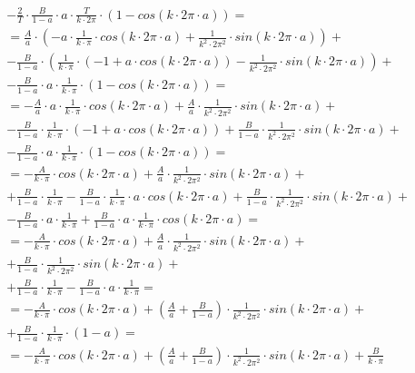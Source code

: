 \begin{task}
\begin{align*}
&- \frac{2}{T}\cdot \frac{B}{1-a}\cdot a \cdot \frac{T}{k \cdot 2\pi} \cdot \left(1 - cos\left(k \cdot 2\pi \cdot a\right) \right)=\\
&=\frac{A}{a}\cdot \left( - a\cdot \frac{1}{k \cdot \pi} \cdot cos\left( k \cdot 2\pi \cdot a\right) + \frac{1}{k^2 \cdot 2\pi^2} \cdot sin\left(k \cdot 2\pi \cdot a\right) \right) + \\
&-\frac{B}{1-a}\cdot \left( \frac{1}{k \cdot \pi} \cdot \left( -1 + a \cdot cos\left( k \cdot 2\pi \cdot a \right)\right) - \frac{1}{k^2 \cdot 2\pi^2} \cdot sin\left( k \cdot 2\pi \cdot a\right)\right) +\\
&- \frac{B}{1-a}\cdot a \cdot \frac{1}{k \cdot \pi} \cdot \left(1 - cos\left(k \cdot 2\pi \cdot a\right) \right)=\\
&= - \frac{A}{a}\cdot a\cdot \frac{1}{k \cdot \pi} \cdot cos\left( k \cdot 2\pi \cdot a\right) + \frac{A}{a}\cdot \frac{1}{k^2 \cdot 2\pi^2} \cdot sin\left(k \cdot 2\pi \cdot a\right) + \\
& -\frac{B}{1-a}\cdot \frac{1}{k \cdot \pi} \cdot \left( -1 + a \cdot cos\left( k \cdot 2\pi \cdot a \right)\right) + \frac{B}{1-a}\cdot \frac{1}{k^2 \cdot 2\pi^2} \cdot sin\left( k \cdot 2\pi \cdot a\right) +\\
&- \frac{B}{1-a}\cdot a \cdot \frac{1}{k \cdot \pi} \cdot \left(1 - cos\left(k \cdot 2\pi \cdot a\right) \right)=\\
&= - \frac{A}{k \cdot \pi} \cdot cos\left( k \cdot 2\pi \cdot a\right) + \frac{A}{a}\cdot \frac{1}{k^2 \cdot 2\pi^2} \cdot sin\left(k \cdot 2\pi \cdot a\right) + \\
& +\frac{B}{1-a}\cdot \frac{1}{k \cdot \pi} -\frac{B}{1-a}\cdot \frac{1}{k \cdot \pi} \cdot a \cdot cos\left( k \cdot 2\pi \cdot a \right) + \frac{B}{1-a}\cdot \frac{1}{k^2 \cdot 2\pi^2} \cdot sin\left( k \cdot 2\pi \cdot a\right) +\\
&- \frac{B}{1-a}\cdot a \cdot \frac{1}{k \cdot \pi} + \frac{B}{1-a}\cdot a \cdot \frac{1}{k \cdot \pi} \cdot cos\left(k \cdot 2\pi \cdot a\right)=\\
&= - \frac{A}{k \cdot \pi} \cdot cos\left( k \cdot 2\pi \cdot a\right) + \frac{A}{a}\cdot \frac{1}{k^2 \cdot 2\pi^2} \cdot sin\left(k \cdot 2\pi \cdot a\right) + \\
& + \frac{B}{1-a}\cdot \frac{1}{k^2 \cdot 2\pi^2} \cdot sin\left( k \cdot 2\pi \cdot a\right) +\\
& +\frac{B}{1-a}\cdot \frac{1}{k \cdot \pi} - \frac{B}{1-a}\cdot a \cdot \frac{1}{k \cdot \pi} =\\
&= - \frac{A}{k \cdot \pi} \cdot cos\left( k \cdot 2\pi \cdot a\right) + \left(\frac{A}{a}+ \frac{B}{1-a}\right)\cdot \frac{1}{k^2 \cdot 2\pi^2} \cdot sin\left(k \cdot 2\pi \cdot a\right) + \\
& +\frac{B}{1-a}\cdot \frac{1}{k \cdot \pi} \cdot \left(1 - a\right) =\\
&= - \frac{A}{k \cdot \pi} \cdot cos\left( k \cdot 2\pi \cdot a\right) + \left(\frac{A}{a}+ \frac{B}{1-a}\right)\cdot \frac{1}{k^2 \cdot 2\pi^2} \cdot sin\left(k \cdot 2\pi \cdot a\right) +\frac{B}{k \cdot \pi}\\
\end{align*}


\end{task}
